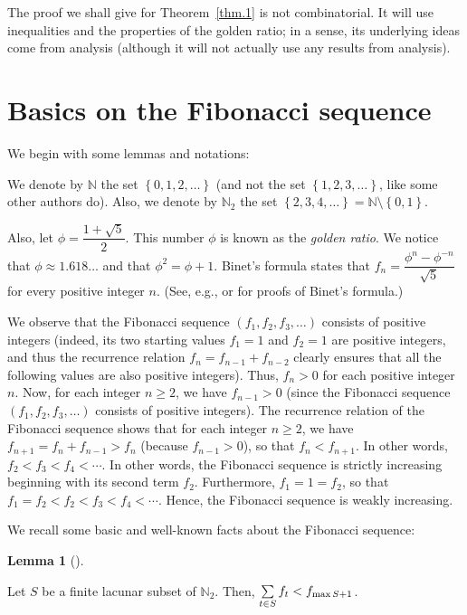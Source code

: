 \documentclass[numbers=enddot,12pt,final,onecolumn,notitlepage]{scrartcl}%
\numberwithin{exer}{section}
\theoremstyle{definition}
\newtheorem{lem}[theo]{Lemma}
\newenvironment{lemma}[1][]
{\begin{lem}[#1]\begin{leftbar}}
{\end{leftbar}\end{lem}}
\let\sumnonlimits\sum
\renewcommand{\sum}{\sumnonlimits\limits}
\begin{document}
The proof we shall give for Theorem~\ref{thm.1} is not combinatorial. It will
use inequalities and the properties of the golden ratio; in a sense, its
underlying ideas come from analysis (although it will not actually use any
results from analysis).

\section{Basics on the Fibonacci sequence}

We begin with some lemmas and notations:

We denote by $\mathbb{N}$ the set $\left\{  0,1,2,\ldots\right\}  $ (and not
the set $\left\{  1,2,3,\ldots\right\}  $, like some other authors do). Also,
we denote by $\mathbb{N}_{2}$ the set $\left\{  2,3,4,\ldots\right\}
=\mathbb{N}\setminus\left\{  0,1\right\}  $.

Also, let $\phi=\dfrac{1+\sqrt{5}}{2}$. This number $\phi$ is known as the
\textit{golden ratio}. We notice that $\phi\approx1.618\ldots$ and that
$\phi^{2}=\phi+1$. Binet's formula states that $f_{n}=\dfrac{\phi^{n}%
-\phi^{-n}}{\sqrt{5}}$ for every positive integer $n$. (See, e.g.,
\cite[Identity 240]{BenQui03} or \cite[(1.20)]{Vorobi02} for proofs of Binet's formula.)

We observe that the Fibonacci sequence $\left(  f_{1},f_{2},f_{3}%
,\ldots\right)  $ consists of positive integers (indeed, its two starting
values $f_{1}=1$ and $f_{2}=1$ are positive integers, and thus the recurrence
relation $f_{n}=f_{n-1}+f_{n-2}$ clearly ensures that all the following values
are also positive integers). Thus, $f_{n} > 0$ for each positive integer $n$.
Now, for each integer $n \geq2$, we have $f_{n-1} > 0$ (since the Fibonacci
sequence $\left(  f_{1},f_{2},f_{3},\ldots\right)  $ consists of positive
integers). The recurrence relation of the Fibonacci sequence shows that for
each integer $n \geq2$, we have $f_{n+1} = f_{n} + f_{n-1} > f_{n}$ (because
$f_{n-1} > 0$), so that $f_{n} < f_{n+1}$. In other words, $f_{2} < f_{3} <
f_{4} < \cdots$. In other words, the Fibonacci sequence is strictly increasing
beginning with its second term $f_{2}$. Furthermore, $f_{1} = 1 = f_{2}$, so
that $f_{1} = f_{2} < f_{2} < f_{3} < f_{4} < \cdots$. Hence, the Fibonacci
sequence is weakly increasing.

We recall some basic and well-known facts about the Fibonacci sequence:

\begin{lemma}
\label{lem.2} Let $S$ be a finite lacunar subset of $\mathbb{N}_{2}$. Then,
$\sum\limits_{t\in S}f_{t}<f_{\max S+1}$.
\end{lemma}
\end{document}
